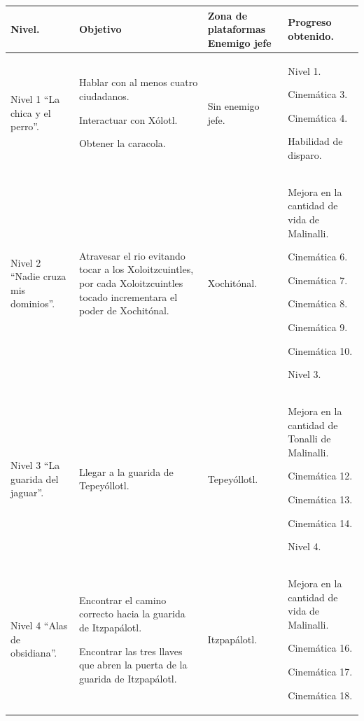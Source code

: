 	\begin{longtable}[c]{ | m{3.75cm} | m{3.75cm}| m{3.75cm} | m{3.75cm}|} 
		\hline
		\rowcolor{cyan} Nivel.& Objetivo & Zona de plataformas	Enemigo jefe & Progreso obtenido. \\ 
		\hline
		Nivel 1 “La chica y el perro”. & 
		Hablar con al menos cuatro ciudadanos.
			\par 
			Interactuar con Xólotl.
			\par 
			Obtener la caracola.&
		Sin enemigo jefe.&
		 Nivel 1.
			\par 
			Cinemática 3.
			\par 
			Cinemática 4.
			\par 
			Habilidad de disparo.		 
		 \\ 
		\hline
		Nivel 2 “Nadie cruza mis dominios”. & 
		Atravesar el rio evitando tocar a los Xoloitzcuintles, por cada Xoloitzcuintles tocado incrementara el poder de Xochitónal. &
		Xochitónal. &
		Mejora en la cantidad de vida de Malinalli.
			\par 
			Cinemática 6.
			\par 
			Cinemática 7.
			\par 
			Cinemática 8.
			\par 
			Cinemática 9.
			\par 
			Cinemática 10.
			\par 
			Nivel 3.		 
		 \\ 
		\hline
		Nivel 3 “La guarida del jaguar”. & 
		Llegar a la guarida de Tepeyóllotl. &
		Tepeyóllotl. &
		Mejora en la cantidad de Tonalli de Malinalli.
			\par 
			Cinemática 12.
			\par
			Cinemática 13.
			\par 
			Cinemática 14.
			\par
			Nivel 4.		 
		 \\ 
		\hline
		Nivel 4 “Alas de obsidiana”. & 
			Encontrar el camino correcto hacia la guarida de Itzpapálotl.
			\par
			Encontrar las tres llaves que abren la puerta de la guarida de Itzpapálotl.&
		Itzpapálotl. &
			 Mejora en la cantidad de vida de Malinalli.
			 \par
			 Cinemática 16.
			 \par
			 Cinemática 17.
			 \par
			 Cinemática 18.
			 \par

\end{longtable}
